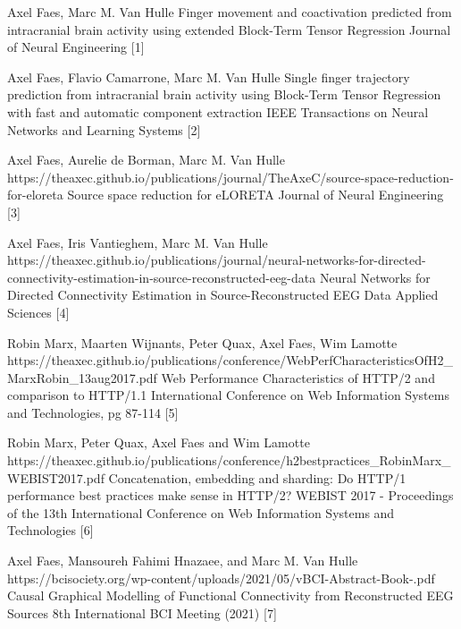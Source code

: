 
\begin{cvpapers}
\cvpaper 
{Axel Faes, Marc M. Van Hulle}
{}
{Finger movement and coactivation predicted from intracranial brain activity using extended Block-Term Tensor Regression}
{Journal of Neural Engineering}
{[1]}

\cvpaper 
{Axel Faes, Flavio Camarrone, Marc M. Van Hulle}
{}
{Single finger trajectory prediction from intracranial brain activity using Block-Term Tensor Regression with fast and automatic component extraction}
{IEEE Transactions on Neural Networks and Learning Systems}
{[2]}

\cvpaper 
{Axel Faes, Aurelie de Borman, Marc M. Van Hulle}
{https://theaxec.github.io/publications/journal/TheAxeC/source-space-reduction-for-eloreta}
{Source space reduction for eLORETA}
{Journal of Neural Engineering}
{[3]}

\cvpaper 
{Axel Faes, Iris Vantieghem, Marc M. Van Hulle}
{https://theaxec.github.io/publications/journal/neural-networks-for-directed-connectivity-estimation-in-source-reconstructed-eeg-data}
{Neural Networks for Directed Connectivity Estimation in Source-Reconstructed EEG Data}
{Applied Sciences}
{[4]}


\end{cvpapers}\begin{cvpapers}
\cvpaper 
{Robin Marx, Maarten Wijnants, Peter Quax, Axel Faes, Wim Lamotte}
{https://theaxec.github.io/publications/conference/WebPerfCharacteristicsOfH2\_MarxRobin\_13aug2017.pdf}
{Web Performance Characteristics of HTTP/2 and comparison to HTTP/1.1}
{International Conference on Web Information Systems and Technologies, pg 87-114}
{[5]}

\cvpaper 
{Robin Marx, Peter Quax, Axel Faes and Wim Lamotte}
{https://theaxec.github.io/publications/conference/h2bestpractices\_RobinMarx\_WEBIST2017.pdf}
{Concatenation, embedding and sharding: Do HTTP/1 performance best practices make sense in HTTP/2?}
{WEBIST 2017 - Proceedings of the 13th International Conference on Web Information Systems and Technologies}
{[6]}


\end{cvpapers}\begin{cvpapers}
\cvpaper 
{Axel Faes, Mansoureh Fahimi Hnazaee, and Marc M. Van Hulle}
{https://bcisociety.org/wp-content/uploads/2021/05/vBCI-Abstract-Book-.pdf}
{Causal Graphical Modelling of Functional Connectivity from Reconstructed EEG Sources}
{8th International BCI Meeting (2021)}
{[7]}


\end{cvpapers}

